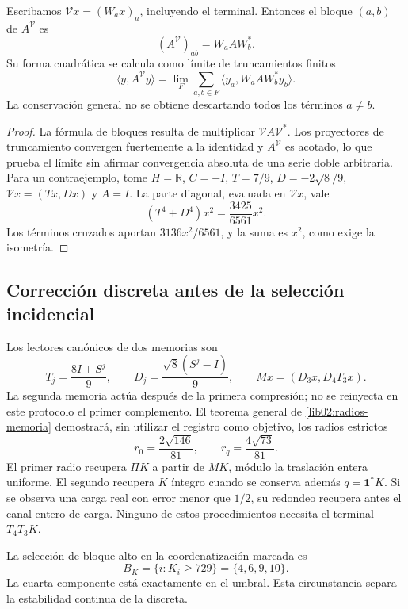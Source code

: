 \begin{proposition}
\label{lib01:correlaciones}
Escribamos \(\mathcal Vx=(W_ax)_a\), incluyendo el terminal. Entonces
el bloque \((a,b)\) de \(A^{\mathcal V}\) es
\[
 (A^{\mathcal V})_{ab}=W_aAW_b^*.
\]
Su forma cuadrática se calcula como límite de truncamientos finitos
\[
 \langle y,A^{\mathcal V}y\rangle
 =\lim_F\sum_{a,b\in F}\langle y_a,W_aAW_b^*y_b\rangle.
\]
La conservación general no se obtiene descartando todos los términos
\(a\ne b\).
\end{proposition}
\begin{proof}
La fórmula de bloques resulta de multiplicar \(\mathcal VA\mathcal V^*\).
Los proyectores de truncamiento convergen fuertemente a la identidad y
\(A^{\mathcal V}\) es acotado, lo que prueba el límite sin afirmar
convergencia absoluta de una serie doble arbitraria. Para un
contraejemplo, tome \(H=\mathbb R\), \(C=-I\),
\(T=7/9\), \(D=-2\sqrt8/9\), \(\mathcal Vx=(Tx,Dx)\) y
\(A=I\). La parte diagonal, evaluada en \(\mathcal Vx\), vale
\[
 (T^4+D^4)x^2=\frac{3425}{6561}x^2.
\]
Los términos cruzados aportan \(3136x^2/6561\), y la suma es
\(x^2\), como exige la isometría.
\end{proof}

\subsection{Corrección discreta antes de la selección incidencial}
\label{lib01:correccion-incidencia}

Los lectores canónicos de dos memorias son
\[
 T_j=\frac{8I+S^j}{9},\qquad
 D_j=\frac{\sqrt8(S^j-I)}9,\qquad
 Mx=(D_3x,D_4T_3x).
\]
La segunda memoria actúa después de la primera compresión; no se reinyecta
en este protocolo el primer complemento. El teorema general de
\cref{lib02:radios-memoria} demostrará, sin utilizar el registro como
objetivo, los radios estrictos
\[
 r_0=\frac{2\sqrt{146}}{81},\qquad
 r_q=\frac{4\sqrt{73}}{81}.
\]
El primer radio recupera \(\Pi K\) a partir de \(MK\), módulo la
traslación entera uniforme. El segundo recupera \(K\) íntegro cuando
se conserva además \(q=\mathbf1^*K\). Si se observa una carga real
con error menor que \(1/2\), su redondeo recupera antes el canal entero
de carga. Ninguno de estos procedimientos necesita el terminal
\(T_4T_3K\).

La selección de bloque alto en la coordenatización marcada es
\begin{equation}
 B_K=\{i:K_i\geq729\}=\{4,6,9,10\}.
 \label{lib01:umbral}
\end{equation}
La cuarta componente está exactamente en el umbral. Esta circunstancia
separa la estabilidad continua de la discreta.

